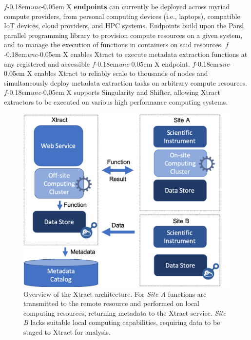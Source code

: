 \documentclass[sigconf, 9pt]{acmart}
\newcommand{\tyler}[1]{}
\newcommand{\tyler}[1]{{\textcolor{cyan}{ tyler: #1 }}}
\newcommand{\name}{Xtract}
\newcommand{\funcx}{$f$\kern-0.18em\emph{unc}\kern-0.05em X}
\begin{document}
\funcx{} \textbf{endpoints} can currently be deployed across myriad compute providers, from personal computing devices (i.e., laptops), compatible 
IoT devices, cloud providers, and HPC systems.  Endpoints build upon the Parsl~\cite{babuji2019parsl} parallel programming library to 
provision compute resources on a given system, and to manage the execution of functions in containers on said resources. \funcx{} enables 
\name{} to execute metadata extraction functions at any registered and accessible \funcx{} endpoint.  \funcx{} enables \name{} to reliably 
scale to thousands of nodes and simultaneously deploy metadata extraction tasks on arbitrary compute resources. 
\funcx{} supports Singularity and Shifter, allowing \name{} extractors to be executed
on various high performance computing systems. 



\begin{figure}[t]
	\centering
	\includegraphics[scale=0.2]{figs/new-arch.png}
	\caption{Overview of the \name{} architecture. For \textit{Site A} functions are transmitted to the remote resource and performed on local computing resources, returning metadata to the \name{} service. \textit{Site B} lacks suitable local
	computing capabilities, requiring data to be staged to \name{} for analysis. \tyler{make more readable in smaller format}}
	\label{fig:arch}
\end{figure}

\end{document}
